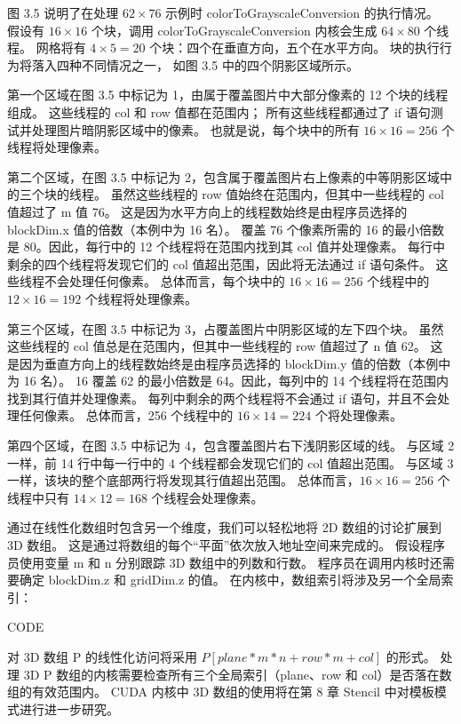 图 3.5 说明了在处理 $62 \times 76$ 示例时 colorToGrayscaleConversion 的执行情况。 
假设有 $16 \times 16$ 个块，调用 colorToGrayscaleConversion 内核会生成 $64 \times 80$ 个线程。 
网格将有 $4 \times 5 = 20$ 个块：四个在垂直方向，五个在水平方向。 块的执行行为将落入四种不同情况之一，
如图 3.5 中的四个阴影区域所示。

第一个区域在图 3.5 中标记为 1，由属于覆盖图片中大部分像素的 12 个块的线程组成。 这些线程的 col 和 row 值都在范围内； 
所有这些线程都通过了 if 语句测试并处理图片暗阴影区域中的像素。 
也就是说，每个块中的所有 $16 \times 16 = 256$ 个线程将处理像素。

第二个区域，在图 3.5 中标记为 2，包含属于覆盖图片右上像素的中等阴影区域中的三个块的线程。 
虽然这些线程的 row 值始终在范围内，但其中一些线程的 col 值超过了 m 值 76。
这是因为水平方向上的线程数始终是由程序员选择的 blockDim.x 值的倍数（本例中为 16 名）。 
覆盖 76 个像素所需的 16 的最小倍数是 80。因此，每行中的 12 个线程将在范围内找到其 col 值并处理像素。 
每行中剩余的四个线程将发现它们的 col 值超出范围，因此将无法通过 if 语句条件。 这些线程不会处理任何像素。 
总体而言，每个块中的 $16 \times 16 = 256$ 个线程中的 $12 \times 16 = 192$ 个线程将处理像素。

第三个区域，在图 3.5 中标记为 3，占覆盖图片中阴影区域的左下四个块。 
虽然这些线程的 col 值总是在范围内，但其中一些线程的 row 值超过了 n 值 62。
这是因为垂直方向上的线程数始终是由程序员选择的 blockDim.y 值的倍数（本例中为 16 名）。 
16 覆盖 62 的最小倍数是 64。因此，每列中的 14 个线程将在范围内找到其行值并处理像素。 
每列中剩余的两个线程将不会通过 if 语句，并且不会处理任何像素。 
总体而言，256 个线程中的 $16 \times 14 = 224$ 个将处理像素。

第四个区域，在图 3.5 中标记为 4，包含覆盖图片右下浅阴影区域的线。 
与区域 2 一样，前 14 行中每一行中的 4 个线程都会发现它们的 col 值超出范围。 
与区域 3 一样，该块的整个底部两行将发现其行值超出范围。 
总体而言，$16 \times 16 = 256$ 个线程中只有 $14 \times 12 = 168$ 个线程会处理像素。

通过在线性化数组时包含另一个维度，我们可以轻松地将 2D 数组的讨论扩展到 3D 数组。 
这是通过将数组的每个“平面”依次放入地址空间来完成的。 假设程序员使用变量 m 和 n 分别跟踪 3D 数组中的列数和行数。 
程序员在调用内核时还需要确定 blockDim.z 和 gridDim.z 的值。 在内核中，数组索引将涉及另一个全局索引：

{\color{red} CODE}

对 3D 数组 P 的线性化访问将采用 $P[plane * m * n +row * m+col]$ 的形式。 
处理 3D P 数组的内核需要检查所有三个全局索引（plane、row 和 col）是否落在数组的有效范围内。 
CUDA 内核中 3D 数组的使用将在第 8 章 Stencil 中对模板模式进行进一步研究。


